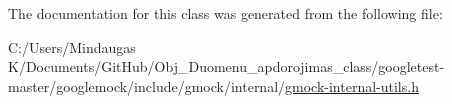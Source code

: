 The documentation for this class was generated from the following file\+:\begin{DoxyCompactItemize}
\item 
C\+:/\+Users/\+Mindaugas K/\+Documents/\+Git\+Hub/\+Obj\+\_\+\+Duomenu\+\_\+apdorojimas\+\_\+class/googletest-\/master/googlemock/include/gmock/internal/\mbox{\hyperlink{googletest-master_2googlemock_2include_2gmock_2internal_2gmock-internal-utils_8h}{gmock-\/internal-\/utils.\+h}}\end{DoxyCompactItemize}
